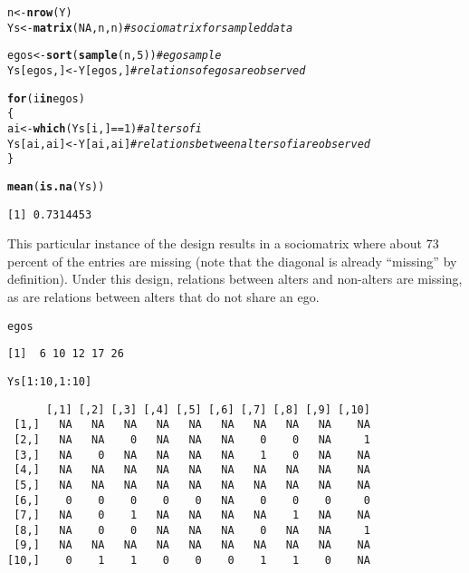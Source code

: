 \documentclass[11pt]{article}\usepackage[]{graphicx}\usepackage[]{color}
\makeatletter
\newcommand{\hlnum}[1]{\textcolor[rgb]{0.686,0.059,0.569}{#1}}%
\newcommand{\hlcom}[1]{\textcolor[rgb]{0.678,0.584,0.686}{\textit{#1}}}%
\newcommand{\hlopt}[1]{\textcolor[rgb]{0,0,0}{#1}}%
\newcommand{\hlstd}[1]{\textcolor[rgb]{0.345,0.345,0.345}{#1}}%
\newcommand{\hlkwa}[1]{\textcolor[rgb]{0.161,0.373,0.58}{\textbf{#1}}}%
\newcommand{\hlkwb}[1]{\textcolor[rgb]{0.69,0.353,0.396}{#1}}%
\newcommand{\hlkwd}[1]{\textcolor[rgb]{0.737,0.353,0.396}{\textbf{#1}}}%
\newenvironment{kframe}{%
 \def\at@end@of@kframe{}%
 \ifinner\ifhmode%
  \def\at@end@of@kframe{\end{minipage}}%
  \begin{minipage}{\columnwidth}%
 \fi\fi%
 \def\FrameCommand##1{\hskip\@totalleftmargin \hskip-\fboxsep
 \colorbox{shadecolor}{##1}\hskip-\fboxsep
     \hskip-\linewidth \hskip-\@totalleftmargin \hskip\columnwidth}%
 \MakeFramed {\advance\hsize-\width
   \@totalleftmargin\z@ \linewidth\hsize
   \@setminipage}}%
 {\par\unskip\endMakeFramed%
 \at@end@of@kframe}
\newenvironment{knitrout}{}{} %
\makeatother
\begin{document}
\begin{knitrout}\footnotesize
{}\color{fgcolor}\begin{kframe}
\begin{alltt}
\hlstd{n}\hlkwb{<-}\hlkwd{nrow}\hlstd{(Y)}
\hlstd{Ys}\hlkwb{<-}\hlkwd{matrix}\hlstd{(}\hlnum{NA}\hlstd{,n,n)}      \hlcom{# sociomatrix for sampled data}

\hlstd{egos}\hlkwb{<-}\hlkwd{sort}\hlstd{(}\hlkwd{sample}\hlstd{(n,}\hlnum{5}\hlstd{))} \hlcom{# ego sample}
\hlstd{Ys[egos,]}\hlkwb{<-}\hlstd{Y[egos,]}     \hlcom{# relations of egos are observed}

\hlkwa{for}\hlstd{(i} \hlkwa{in} \hlstd{egos)}
\hlstd{\{}
  \hlstd{ai}\hlkwb{<-}\hlkwd{which}\hlstd{(Ys[i,]}\hlopt{==}\hlnum{1}\hlstd{)}  \hlcom{# alters of i  }
  \hlstd{Ys[ai,ai]}\hlkwb{<-}\hlstd{Y[ai,ai]}   \hlcom{# relations between alters of i are observed}
\hlstd{\}}

\hlkwd{mean}\hlstd{(}\hlkwd{is.na}\hlstd{(Ys))}
\end{alltt}
\begin{verbatim}
[1] 0.7314453
\end{verbatim}
\end{kframe}
\end{knitrout}
This particular instance of the design results in a sociomatrix 
where about 73 
percent of the entries are missing
(note that the diagonal is  already ``missing'' by definition). 
Under this design, relations between alters and non-alters
are missing, as are relations between alters that do not share an ego.
\begin{knitrout}\footnotesize
{}\color{fgcolor}\begin{kframe}
\begin{alltt}
\hlstd{egos}
\end{alltt}
\begin{verbatim}
[1]  6 10 12 17 26
\end{verbatim}
\begin{alltt}
\hlstd{Ys[}\hlnum{1}\hlopt{:}\hlnum{10}\hlstd{,}\hlnum{1}\hlopt{:}\hlnum{10}\hlstd{]}
\end{alltt}
\begin{verbatim}
      [,1] [,2] [,3] [,4] [,5] [,6] [,7] [,8] [,9] [,10]
 [1,]   NA   NA   NA   NA   NA   NA   NA   NA   NA    NA
 [2,]   NA   NA    0   NA   NA   NA    0    0   NA     1
 [3,]   NA    0   NA   NA   NA   NA    1    0   NA    NA
 [4,]   NA   NA   NA   NA   NA   NA   NA   NA   NA    NA
 [5,]   NA   NA   NA   NA   NA   NA   NA   NA   NA    NA
 [6,]    0    0    0    0    0   NA    0    0    0     0
 [7,]   NA    0    1   NA   NA   NA   NA    1   NA    NA
 [8,]   NA    0    0   NA   NA   NA    0   NA   NA     1
 [9,]   NA   NA   NA   NA   NA   NA   NA   NA   NA    NA
[10,]    0    1    1    0    0    0    1    1    0    NA
\end{verbatim}
\end{kframe}
\end{knitrout}
\end{document}
